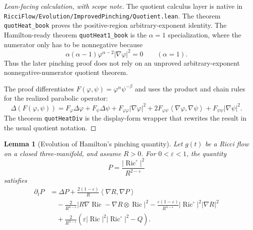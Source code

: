 \documentclass[11pt]{article}
\theoremstyle{plain}
\newtheorem{lemma}[theorem]{Lemma}
\theoremstyle{definition}
\theoremstyle{remark}
\newcommand{\Ric}{\operatorname{Ric}}
\newcommand{\ip}[2]{\left\langle #1,#2\right\rangle}
\newcommand{\norm}[1]{\left|#1\right|}
\newcommand{\eps}{\varepsilon}
\newcommand{\leanref}[1]{\nolinkurl{#1}}
\newcommand{\leanfile}[1]{\nolinkurl{#1}}
\newcommand{\rffile}[1]{\leanfile{#1}}
\begin{document}
\begin{proof}[Lean-facing calculation, with scope note]
The quotient calculus layer is native in
\rffile{RicciFlow/Evolution/ImprovedPinching/Quotient.lean}.
The theorem \leanref{quotHeat_book} proves the positive-region
arbitrary-exponent identity.  The Hamilton-ready theorem
\leanref{quotHeat1_book} is the \(\alpha=1\) specialization, where the
numerator only has to be nonnegative because
\[
  \alpha(\alpha-1)\varphi^{\alpha-2}\norm{\nabla\varphi}^2=0
  \qquad (\alpha=1).
\]
Thus the later pinching proof does not rely on an unproved arbitrary-exponent
nonnegative-numerator quotient theorem.

The proof differentiates
\(F(\varphi,\psi)=\varphi^\alpha\psi^{-\beta}\) and uses the product and chain
rules for the realized parabolic operator:
\[
\Delta(F(\varphi,\psi))
=F_\varphi\Delta\varphi+F_\psi\Delta\psi
+F_{\varphi\varphi}\norm{\nabla\varphi}^2
+2F_{\varphi\psi}\ip{\nabla\varphi}{\nabla\psi}
+F_{\psi\psi}\norm{\nabla\psi}^2.
\]
The theorem \leanref{quotHeatDiv} is the display-form wrapper that rewrites the
result in the usual quotient notation.
\end{proof}

\begin{lemma}[Evolution of Hamilton's pinching quantity]
\label{lem:evol-pinching-P}
Let $g(t)$ be a Ricci flow on a closed three-manifold, and assume $R>0$. For
$0<\eps<1$, the quantity
\[
P=\frac{\norm{\Ric^\circ}^2}{R^{2-\eps}}
\]
satisfies
\begin{align}
\partial_tP
&=
\Delta P
+
\frac{2(1-\eps)}{R}\ip{\nabla R}{\nabla P}
\nonumber\\
&\quad
-
\frac{2}{R^{4-\eps}}
\norm{R\nabla\Ric-\nabla R\otimes\Ric}^2
-
\frac{\eps(1-\eps)}{R^{4-\eps}}
\norm{\Ric^\circ}^2\norm{\nabla R}^2
\nonumber\\
&\quad
+
\frac{2}{R^{3-\eps}}
\left(
\eps\norm{\Ric}^2\norm{\Ric^\circ}^2-Q
\right).
\label{eq:evol-pinching-P}
\end{align}
\end{lemma}
\end{document}
